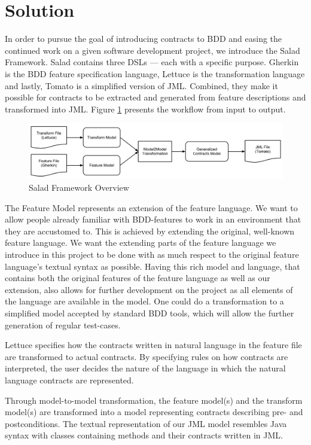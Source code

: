 \section{Solution}

In order to pursue the goal of introducing contracts to BDD and easing the continued work on a given software development project, we introduce the Salad Framework. Salad contains three DSLs --- each with a specific purpose. Gherkin is the BDD feature specification language, Lettuce is the transformation language and lastly, Tomato is a simplified version of JML.  Combined, they make it possible for contracts to be extracted and generated from feature descriptions and transformed into JML. Figure \ref{fig:saladoverview} presents the workflow from input to output.

\begin{figure}
	\begin{center}
		\includegraphics[scale=0.3]{images/framework_overview.png}
	\end{center}
	\caption{Salad Framework Overview}
	\label{fig:saladoverview}
\end{figure}

The Feature Model represents an extension of the feature language.
We want to allow people already familiar with BDD-features to work in an environment that they are accustomed to. 
This is achieved by extending the original, well-known feature language. 
We want the extending parts of the feature language we introduce in this project to be done with as much respect to the original feature language's textual syntax as possible. 
Having this rich model and language, that contains both the original features of the feature language as well as our extension, 
also allows for further development on the project as all elements of the language are available in the model. 
One could do a transformation to a simplified model accepted by standard BDD tools, which will allow the further generation of regular test-cases.

Lettuce specifies how the contracts written in natural language in the feature file are transformed to actual contracts.
By specifying rules on how contracts are interpreted, the user decides the nature of the language in which the natural language contracts are represented. 

Through model-to-model transformation, the feature model(s) and the transform model(s) are transformed into a model representing contracts describing pre- and postconditions. The textual representation of our JML model resembles Java syntax with classes containing methods and their contracts written in JML.
